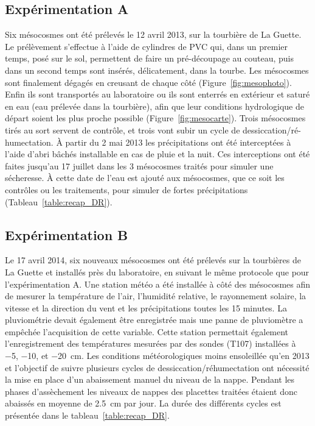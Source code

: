 \subsection{Expérimentation A}
Six mésocosmes ont été prélevés le 12 avril 2013, sur la tourbière de La Guette.
Le prélèvement s'effectue à l'aide de cylindres de PVC qui, dans un premier temps, posé sur le sol, permettent de faire un pré-découpage au couteau, puis dans un second temps sont insérés, délicatement, dans la tourbe. 
Les mésocosmes sont finalement dégagés en creusant de chaque côté (Figure~\ref{fig:mesophoto}).
Enfin ils sont transportés au laboratoire ou ils sont enterrés en extérieur et saturé en eau (eau prélevée dans la tourbière), afin que leur conditions hydrologique de départ soient les plus proche possible (Figure~\ref{fig:mesocarte}).
Trois mésocosmes tirés au sort servent de contrôle, et trois vont subir un cycle de dessiccation/ré-humectation.
À partir du 2 mai 2013 les précipitations ont été interceptées à l'aide d'abri bâchés installable en cas de pluie et la nuit.
Ces interceptions ont été faites jusqu'au 17 juillet dans les 3 mésocosmes traités pour simuler une sécheresse.
À cette date de l'eau est ajouté aux mésocosmes, que ce soit les contrôles ou les traitements, pour simuler de fortes précipitations (Tableau~\ref{table:recap_DR}).

\subsection{Expérimentation B}
Le 17 avril 2014, six nouveaux mésocosmes ont été prélevés sur la tourbières de La Guette et installés près du laboratoire, en suivant le même protocole que pour l'expérimentation A.
Une station météo a été installée à côté des mésocosmes afin de mesurer la température de l'air, l'humidité relative, le rayonnement solaire, la vitesse et la direction du vent et les précipitations toutes les 15 minutes.
La pluviométrie devait également être enregistrée mais une panne de pluviomètre a empêchée l'acquisition de cette variable.
Cette station permettait également l'enregistrement des températures mesurées par des sondes (T107) installées à \num{-5}, \num{-10}, et \SI{-20}{\centi\metre}.
Les conditions météorologiques moins ensoleillée qu'en 2013 et l'objectif de suivre plusieurs cycles de dessiccation/réhumectation ont nécessité la mise en place d'un abaissement manuel du niveau de la nappe.
Pendant les phases d'assèchement les niveaux de nappes des placettes traitées étaient donc abaissés en moyenne de \SI{2.5}{\centi\metre} par jour.
La durée des différents cycles est présentée dans le tableau~\ref{table:recap_DR}.


